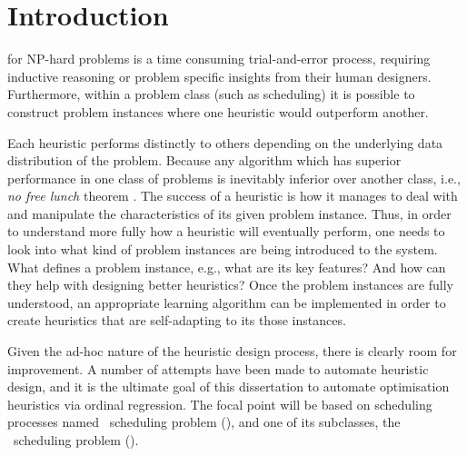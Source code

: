 
\chapter{Introduction}\label{ch:introduction} 

 for NP-hard problems is a time 
consuming trial-and-error process, requiring inductive reasoning or problem 
specific insights from their human designers. Furthermore, within a problem 
class (such as scheduling) it is possible to construct problem instances where 
one heuristic would outperform another. 

Each heuristic performs distinctly to others depending on the underlying data 
distribution of the problem. Because any algorithm which 
has superior performance in one class of problems is inevitably inferior over 
another class, i.e., \emph{no free lunch} theorem \citep{Wolpert97nofree}. 
The success of a heuristic is how it manages to deal with and manipulate the 
characteristics of its given problem instance. Thus, in order to understand 
more fully how a heuristic will eventually perform, one needs to look into what 
kind of problem instances are being introduced to the system. What defines a 
problem instance, e.g., what are its key features? And how can they help with 
designing better heuristics? Once the problem instances are fully understood, 
an appropriate learning algorithm can be implemented in order to create 
heuristics that are  self-adapting to its those instances.

Given the ad-hoc nature of the heuristic design process, there is clearly room 
for improvement. A number of attempts have been made to automate heuristic 
design, and it is the ultimate goal of this dissertation to automate 
optimisation heuristics via ordinal regression. 
The focal point will be based on scheduling processes named \jsp\ scheduling 
problem (\JSP), and one of its subclasses, the \fsp\ scheduling problem 
(\FSP).

